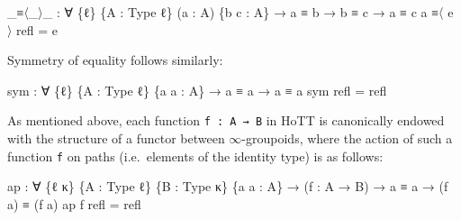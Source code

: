 \documentclass[
  11pt,
  oneside,
  article]{memoir}
\newenvironment{Shaded}{}{}
\newcommand{\NormalTok}[1]{#1}
\newcommand{\OtherTok}[1]{\textcolor[rgb]{0.00,0.44,0.13}{#1}}
\theoremstyle{definition}
\theoremstyle{plain}
\newcommand{\0}{\textsf{0}}
\newcommand{\1}{\tn{\textsf{1}}}
\begin{document}
\begin{Shaded}
\begin{Highlighting}[]
\OtherTok{\_}\NormalTok{≡〈}\OtherTok{\_}\NormalTok{〉}\OtherTok{\_} \OtherTok{:} \OtherTok{∀} \OtherTok{\{}\NormalTok{ℓ}\OtherTok{\}} \OtherTok{\{}\NormalTok{A }\OtherTok{:}\NormalTok{ Type ℓ}\OtherTok{\}} \OtherTok{(}\NormalTok{a }\OtherTok{:}\NormalTok{ A}\OtherTok{)} \OtherTok{\{}\NormalTok{b c }\OtherTok{:}\NormalTok{ A}\OtherTok{\}} 
          \OtherTok{→}\NormalTok{ a ≡ b }\OtherTok{→}\NormalTok{ b ≡ c }\OtherTok{→}\NormalTok{ a ≡ c}
\NormalTok{a ≡〈 e 〉 refl }\OtherTok{=}\NormalTok{ e}
\end{Highlighting}
\end{Shaded}

Symmetry of equality follows similarly:

\begin{Shaded}
\begin{Highlighting}[]
\NormalTok{sym }\OtherTok{:} \OtherTok{∀} \OtherTok{\{}\NormalTok{ℓ}\OtherTok{\}} \OtherTok{\{}\NormalTok{A }\OtherTok{:}\NormalTok{ Type ℓ}\OtherTok{\}} \OtherTok{\{}\NormalTok{a a\textquotesingle{} }\OtherTok{:}\NormalTok{ A}\OtherTok{\}} \OtherTok{→}\NormalTok{ a ≡ a\textquotesingle{} }\OtherTok{→}\NormalTok{ a\textquotesingle{} ≡ a}
\NormalTok{sym refl }\OtherTok{=}\NormalTok{ refl}
\end{Highlighting}
\end{Shaded}

As mentioned above, each function \texttt{f\ :\ A\ →\ B} in HoTT is
canonically endowed with the structure of a functor between
\(\infty\)-groupoids, where the action of such a function \texttt{f} on
paths (i.e.~elements of the identity type) is as follows:

\begin{Shaded}
\begin{Highlighting}[]
\NormalTok{ap }\OtherTok{:} \OtherTok{∀} \OtherTok{\{}\NormalTok{ℓ κ}\OtherTok{\}} \OtherTok{\{}\NormalTok{A }\OtherTok{:}\NormalTok{ Type ℓ}\OtherTok{\}} \OtherTok{\{}\NormalTok{B }\OtherTok{:}\NormalTok{ Type κ}\OtherTok{\}} \OtherTok{\{}\NormalTok{a a\textquotesingle{} }\OtherTok{:}\NormalTok{ A}\OtherTok{\}}
     \OtherTok{→} \OtherTok{(}\NormalTok{f }\OtherTok{:}\NormalTok{ A }\OtherTok{→}\NormalTok{ B}\OtherTok{)} \OtherTok{→}\NormalTok{ a ≡ a\textquotesingle{} }\OtherTok{→} \OtherTok{(}\NormalTok{f a}\OtherTok{)}\NormalTok{ ≡ }\OtherTok{(}\NormalTok{f a\textquotesingle{}}\OtherTok{)}
\NormalTok{ap f refl }\OtherTok{=}\NormalTok{ refl}
\end{Highlighting}
\end{Shaded}
\end{document}

